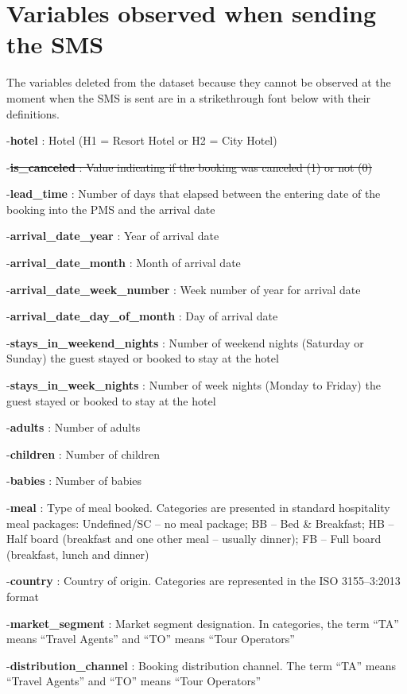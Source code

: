 \documentclass[10pt,a4paper]{article}
\theoremstyle{break}
\begin{document}
\newpage

\hypertarget{annexe:annexe3}{%
\section{Variables observed when sending the SMS}\label{annexe:annexe3}}

The variables deleted from the dataset because they cannot be observed at the moment when the SMS is sent are in a strikethrough font below with their definitions.

-\textbf{hotel} : Hotel (H1 = Resort Hotel or H2 = City Hotel)

-\sout{\textbf{is\_canceled} : Value indicating if the booking was canceled (1) or not (0)}

-\textbf{lead\_time} : Number of days that elapsed between the entering date of the booking into the PMS and the arrival date

-\textbf{arrival\_date\_year} : Year of arrival date

-\textbf{arrival\_date\_month} : Month of arrival date

-\textbf{arrival\_date\_week\_number} : Week number of year for arrival date

-\textbf{arrival\_date\_day\_of\_month} : Day of arrival date

-\textbf{stays\_in\_weekend\_nights} : Number of weekend nights (Saturday or Sunday) the guest stayed or booked to stay at the hotel

-\textbf{stays\_in\_week\_nights} : Number of week nights (Monday to Friday) the guest stayed or booked to stay at the hotel

-\textbf{adults} : Number of adults

-\textbf{children} : Number of children

-\textbf{babies} : Number of babies

-\textbf{meal} : Type of meal booked. Categories are presented in standard hospitality meal packages: Undefined/SC -- no meal package; BB -- Bed \& Breakfast; HB -- Half board (breakfast and one other meal -- usually dinner); FB -- Full board (breakfast, lunch and dinner)

-\textbf{country} : Country of origin. Categories are represented in the ISO 3155--3:2013 format

-\textbf{market\_segment} : Market segment designation. In categories, the term ``TA'' means ``Travel Agents'' and ``TO'' means ``Tour Operators''

-\textbf{distribution\_channel} : Booking distribution channel. The term ``TA'' means ``Travel Agents'' and ``TO'' means ``Tour Operators''
\end{document}
